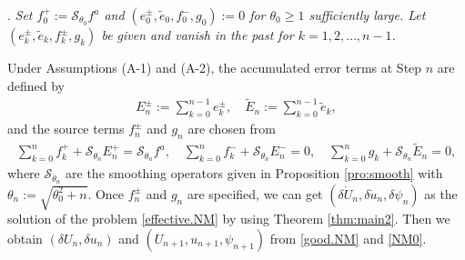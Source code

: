 \documentclass[twoside,11pt]{article}
\numberwithin{equation}{section}
\begin{document}
\vspace{2mm}
. {\it Set $f_0^{+}:=\mathcal{S}_{\theta_0}f^a$ and $(e_0^{\pm},\tilde{e}_0 ,f_0^-,g_0):=0$ for $\theta_0\geq 1$ sufficiently large.
	Let $(e_k^{\pm},\tilde{e}_k ,f_k^{\pm},g_k)$ be given and vanish in the past for $k=1,2,\ldots,{n}-1$.}

\vspace{1mm}

Under Assumptions (A-1) and (A-2), the accumulated error terms at Step ${n}$ are defined by
\begin{align}  \label{E.E.tilde}
	E_{{n}}^{\pm}:=\sum_{k=0}^{{n}-1}e_{k}^{\pm},\quad \widetilde{E}_{{n}} :=\sum_{k=0}^{{n}-1}\tilde{e}_{k} ,
\end{align}
and the source terms $f_n^{\pm}$ and $g_n$ are chosen from
\begin{align} \label{source}
	\sum_{k=0}^{{n}} f_k^+ +\mathcal{S}_{\theta_{{n}}}E_{{n}}^+=\mathcal{S}_{\theta_{{n}}}f^a,\quad
	\sum_{k=0}^{{n}}f_k^{-}+\mathcal{S}_{\theta_{{n}}}{E}_{{n}}^{-}=0,\quad
	\sum_{k=0}^{{n}}g_k +\mathcal{S}_{\theta_{{n}}}\widetilde{E}_{{n}} =0,
\end{align}
where  $\mathcal{S}_{\theta_{{n}}}$
are the smoothing operators given in Proposition \ref{pro:smooth} with
$\theta_{{n}}:=\sqrt{\theta^2_0+{n}}.$
Once $f_n^{\pm}$ and $g_n $ are specified,
we can get
$(\delta \dot{U}_{{n}},\delta\dot{u}_n, \delta \psi_{{n}})$ as the solution of
the problem \eqref{effective.NM} by using Theorem \ref{thm:main2}.
Then we obtain $(\delta U_{{n}}, \delta u_{{n}})$ and $(U_{n+1}, u_{n+1},\psi_{{n}+1})$ from \eqref{good.NM} and \eqref{NM0}.
\end{document}
